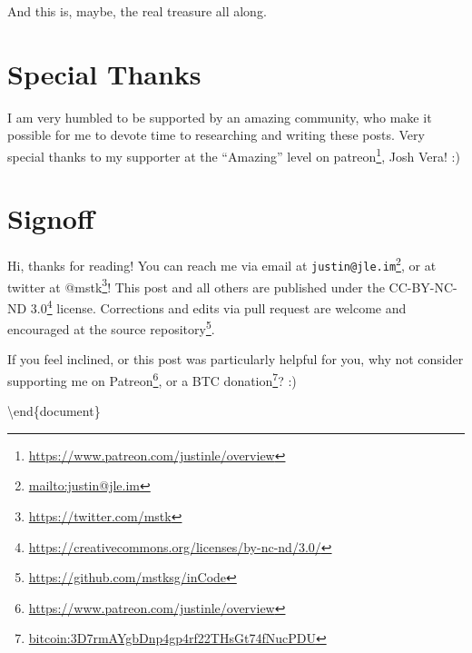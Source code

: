 \documentclass[]{article}
\renewcommand{\href}[2]{#2\footnote{\url{#1}}}
\begin{document}
And this is, maybe, the real treasure all along.

\section{Special Thanks}\label{special-thanks}

I am very humbled to be supported by an amazing community, who make it possible
for me to devote time to researching and writing these posts. Very special
thanks to my supporter at the ``Amazing'' level on
\href{https://www.patreon.com/justinle/overview}{patreon}, Josh Vera! :)

\section{Signoff}\label{signoff}

Hi, thanks for reading! You can reach me via email at
\href{mailto:justin@jle.im}{\nolinkurl{justin@jle.im}}, or at twitter at
\href{https://twitter.com/mstk}{@mstk}! This post and all others are published
under the \href{https://creativecommons.org/licenses/by-nc-nd/3.0/}{CC-BY-NC-ND
3.0} license. Corrections and edits via pull request are welcome and encouraged
at \href{https://github.com/mstksg/inCode}{the source repository}.

If you feel inclined, or this post was particularly helpful for you, why not
consider \href{https://www.patreon.com/justinle/overview}{supporting me on
Patreon}, or a \href{bitcoin:3D7rmAYgbDnp4gp4rf22THsGt74fNucPDU}{BTC donation}?
:)

\textbackslash end\{document\}
\end{document}
